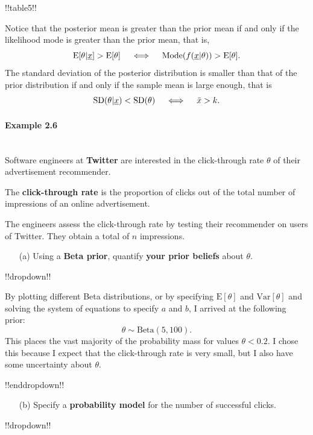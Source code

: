 {!!table5!!

Notice that the posterior mean is greater than the prior mean if and only if the likelihood mode is greater than the prior mean, that is,
\begin{equation*}
\text{E}[\theta|\underline{x}]>\text{E}[\theta]\quad\iff\quad 
\textnormal{Mode}(f(\underline{x}|\theta))>\text{E}[\theta].
\end{equation*}
The standard deviation of the posterior distribution is smaller than that of the prior distribution if and only if the sample mean is large enough, that is
$$
\textnormal{SD}(\theta|\underline{x})<\textnormal{SD}(\theta)\quad\iff\quad \bar x > k.
$$}

\clearpage

\paragraph{Example 2.6}{~\\
Software engineers at \textbf{\color{darkblue}Twitter} are interested in the click-through rate $\theta$ of their advertisement recommender.

The \textbf{\color{darkblue}click-through rate} is the proportion of clicks out of the total number of impressions of an online advertisement.

The engineers assess the click-through rate by testing their recommender on users of Twitter. They obtain a total of $n$ impressions.

\begin{itemize}
\item [(a)] Using a \textbf{\color{darkblue}Beta prior}, quantify \textbf{\color{darkblue}your prior beliefs} about $\theta$.
\end{itemize}

!!dropdown!!

By plotting different Beta distributions, or by specifying $\text{E}[\theta]$ and $\text{Var}[\theta]$ and solving the system of equations to specify $a$ and $b$, I arrived at the following prior:
    $$ \theta \sim \mathrm{Beta}(5, 100). $$
    This places the vast majority of the probability mass for values $\theta < 0.2$. I chose this because I expect that the click-through rate is very small, but I also have some uncertainty about $\theta$.

!!enddropdown!!

\begin{itemize}
\item [(b)] Specify a \textbf{\color{darkblue}probability model} for the number of successful clicks.
\end{itemize}
!!dropdown!!

}
